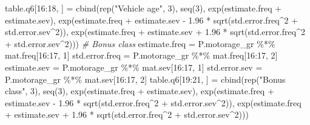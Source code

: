 \documentclass[
]{article}
\newenvironment{Shaded}{\begin{snugshade}}{\end{snugshade}}
\newcommand{\CommentTok}[1]{\textcolor[rgb]{0.56,0.35,0.01}{\textit{#1}}}
\newcommand{\DecValTok}[1]{\textcolor[rgb]{0.00,0.00,0.81}{#1}}
\newcommand{\FloatTok}[1]{\textcolor[rgb]{0.00,0.00,0.81}{#1}}
\newcommand{\FunctionTok}[1]{\textcolor[rgb]{0.00,0.00,0.00}{#1}}
\newcommand{\NormalTok}[1]{#1}
\newcommand{\OtherTok}[1]{\textcolor[rgb]{0.56,0.35,0.01}{#1}}
\newcommand{\SpecialCharTok}[1]{\textcolor[rgb]{0.00,0.00,0.00}{#1}}
\newcommand{\StringTok}[1]{\textcolor[rgb]{0.31,0.60,0.02}{#1}}
\begin{document}
\begin{Shaded}
\begin{Highlighting}[]
\NormalTok{table.q6[}\DecValTok{16}\SpecialCharTok{:}\DecValTok{18}\NormalTok{, ] }\OtherTok{=} \FunctionTok{cbind}\NormalTok{(}\FunctionTok{rep}\NormalTok{(}\StringTok{"Vehicle age"}\NormalTok{, }\DecValTok{3}\NormalTok{), }\FunctionTok{seq}\NormalTok{(}\DecValTok{3}\NormalTok{), }\FunctionTok{exp}\NormalTok{(estimate.freq }\SpecialCharTok{+}\NormalTok{ estimate.sev), }
                    \FunctionTok{exp}\NormalTok{(estimate.freq }\SpecialCharTok{+}\NormalTok{ estimate.sev }\SpecialCharTok{{-}} \FloatTok{1.96} \SpecialCharTok{*} \FunctionTok{sqrt}\NormalTok{(std.error.freq}\SpecialCharTok{\^{}}\DecValTok{2} \SpecialCharTok{+}\NormalTok{ std.error.sev}\SpecialCharTok{\^{}}\DecValTok{2}\NormalTok{)), }
                    \FunctionTok{exp}\NormalTok{(estimate.freq }\SpecialCharTok{+}\NormalTok{ estimate.sev }\SpecialCharTok{+} \FloatTok{1.96} \SpecialCharTok{*} \FunctionTok{sqrt}\NormalTok{(std.error.freq}\SpecialCharTok{\^{}}\DecValTok{2} \SpecialCharTok{+}\NormalTok{ std.error.sev}\SpecialCharTok{\^{}}\DecValTok{2}\NormalTok{)))}
\CommentTok{\# Bonus class}
\NormalTok{estimate.freq }\OtherTok{=}\NormalTok{ P.motorage\_gr }\SpecialCharTok{\%*\%}\NormalTok{ mat.freq[}\DecValTok{16}\SpecialCharTok{:}\DecValTok{17}\NormalTok{, }\DecValTok{1}\NormalTok{]}
\NormalTok{std.error.freq }\OtherTok{=}\NormalTok{ P.motorage\_gr }\SpecialCharTok{\%*\%}\NormalTok{ mat.freq[}\DecValTok{16}\SpecialCharTok{:}\DecValTok{17}\NormalTok{, }\DecValTok{2}\NormalTok{]}
\NormalTok{estimate.sev }\OtherTok{=}\NormalTok{ P.motorage\_gr }\SpecialCharTok{\%*\%}\NormalTok{ mat.sev[}\DecValTok{16}\SpecialCharTok{:}\DecValTok{17}\NormalTok{, }\DecValTok{1}\NormalTok{]}
\NormalTok{std.error.sev }\OtherTok{=}\NormalTok{ P.motorage\_gr }\SpecialCharTok{\%*\%}\NormalTok{ mat.sev[}\DecValTok{16}\SpecialCharTok{:}\DecValTok{17}\NormalTok{, }\DecValTok{2}\NormalTok{]}
\NormalTok{table.q6[}\DecValTok{19}\SpecialCharTok{:}\DecValTok{21}\NormalTok{, ] }\OtherTok{=} \FunctionTok{cbind}\NormalTok{(}\FunctionTok{rep}\NormalTok{(}\StringTok{"Bonus class"}\NormalTok{, }\DecValTok{3}\NormalTok{), }\FunctionTok{seq}\NormalTok{(}\DecValTok{3}\NormalTok{), }\FunctionTok{exp}\NormalTok{(estimate.freq }\SpecialCharTok{+}\NormalTok{ estimate.sev), }
                    \FunctionTok{exp}\NormalTok{(estimate.freq }\SpecialCharTok{+}\NormalTok{ estimate.sev }\SpecialCharTok{{-}} \FloatTok{1.96} \SpecialCharTok{*} \FunctionTok{sqrt}\NormalTok{(std.error.freq}\SpecialCharTok{\^{}}\DecValTok{2} \SpecialCharTok{+}\NormalTok{ std.error.sev}\SpecialCharTok{\^{}}\DecValTok{2}\NormalTok{)), }
                    \FunctionTok{exp}\NormalTok{(estimate.freq }\SpecialCharTok{+}\NormalTok{ estimate.sev }\SpecialCharTok{+} \FloatTok{1.96} \SpecialCharTok{*} \FunctionTok{sqrt}\NormalTok{(std.error.freq}\SpecialCharTok{\^{}}\DecValTok{2} \SpecialCharTok{+}\NormalTok{ std.error.sev}\SpecialCharTok{\^{}}\DecValTok{2}\NormalTok{)))}


\end{Highlighting}
\end{Shaded}
\end{document}
